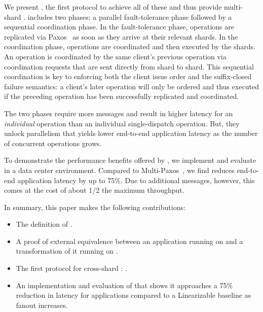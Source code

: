 We present \sys{}, the first protocol to achieve all of these and thus
provide multi-shard \mdl{}.
\sys{} includes two phases: a parallel fault-tolerance phase followed by a sequential coordination phase.
In the fault-tolerance phase, operations are replicated via Paxos~\cite{lamport1998paxos} as soon as they arrive at their relevant shards.
In the coordination phase, operations are coordinated and then executed by the shards. An operation is coordinated by the same client's previous operation via coordination requests that are sent directly from shard to shard.
This sequential coordination is key to enforcing both the client issue order and the suffix-closed failure semantics:
a client's later operation will only be ordered and thus executed if the preceding operation has been successfully replicated and coordinated.

The two phases require more messages and result in higher latency for an \textit{individual} operation than an individual single-dispatch operation.
But, they unlock parallelism that yields lower end-to-end application latency as the number of concurrent operations grows.

%



To demonstrate the performance benefits offered by \MDL{},
we implement and evaluate \sys{} in a data center environment.
Compared to Multi-Paxos~\cite{lamport1998paxos}, we find \sys{}
reduces end-to-end application latency by up to 75\%. Due to
additional messages, however, this comes at the cost of about 1/2 the
maximum throughput.

In summary, this paper makes the following contributions:
\begin{itemize}[leftmargin=*]
\item The definition of \mdllong{}.
\item A proof of external equivalence between an application running on \sdl{} and a transformation of it running on \mdl{}.
\item The first protocol for cross-shard \mdl{}: \sys{}.
\item An implementation and evaluation of \sys{} that shows it approaches a 75\% reduction in latency for applications compared to a Linearizable baseline as fanout increases.
\end{itemize}
